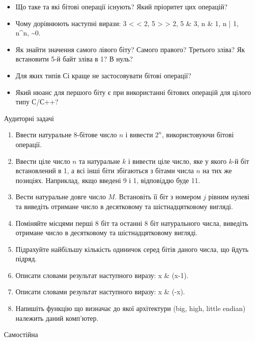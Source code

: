 \documentclass[]{article}
\begin{document}
\begin{itemize}
\item
  Що таке та які бітові операції існують? Який пріоритет цих операцій?
\item
  Чому дорівнюють наступні вирази:
  3 \textless{} \textless{} 2, 5 \textgreater{} \textgreater{} 2, 5 \& 3, n \& 1, n | 1, n\textasciicircum n, \textasciitilde{}0.
\item
  Як знайти значення самого лівого біту? Самого правого? Третього зліва?
  Як встановити 5-й байт зліва в 1? В нуль?
\item
  Для яких типів Сі краще не застосовувати бітові операції?
\item
  Який нюанс для першого біту є при використанні бітових операцій для
  цілого типу С/С++?
\end{itemize}

Аудиторні задачі

\begin{enumerate}
\def\labelenumi{\arabic{enumi})}
\item
  Ввести натуральне 8-бітове число $n$ і вивести $2^{n}$, використовуючи бітові операції.
\item
  Ввести ціле число $n$ та натуральне $k$ і вивести ціле число, яке у якого
  $k$-й біт встановлений в 1, а всі інші біти збігаються з бітами числа $n$
  на тих же позиціях. Наприклад, якщо введені 9 і 1, відповіддю буде 11.
\item
  Вести натуральне довге число $M$. Встановіть її біт
  з номером $j$ рівним нулеві та виведіть отримане число в десятковому та
  шістнадцятковому вигляді.
\item
  Поміняйте місцями перші 8 біт та останні 8 біт натурального числа,
  виведіть отримане число в десятковому та шістнадцятковому вигляді.
\item
  Підрахуйте найбільшу кількість одиничок серед бітів даного числа, що
  йдуть підряд.
\item
  Описати словами результат наступного виразу: x \& (x-1).
\item
  Описати словами результат наступного виразу: x \& (-x).
\item
  Напишіть функцію що визначає до якої архітектури (big, high, little
  endian) належить даний комп'ютер.
\end{enumerate}

Самостійна
\end{document}
